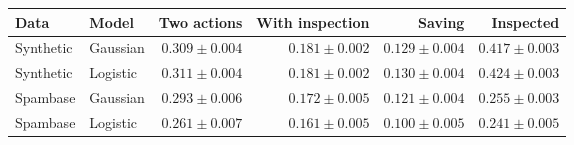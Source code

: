 \begin{tabular}{llrrrr}
\toprule
Data & Model & Two actions & With inspection & Saving & Inspected\\
\midrule
Synthetic & Gaussian & \(0.309\pm0.004\) & \(0.181\pm0.002\) & \(0.129\pm0.004\) & \(0.417\pm0.003\)\\
Synthetic & Logistic & \(0.311\pm0.004\) & \(0.181\pm0.002\) & \(0.130\pm0.004\) & \(0.424\pm0.003\)\\
Spambase & Gaussian & \(0.293\pm0.006\) & \(0.172\pm0.005\) & \(0.121\pm0.004\) & \(0.255\pm0.003\)\\
Spambase & Logistic & \(0.261\pm0.007\) & \(0.161\pm0.005\) & \(0.100\pm0.005\) & \(0.241\pm0.005\)\\
\bottomrule
\end{tabular}
